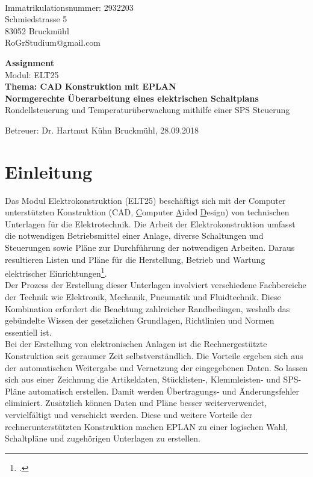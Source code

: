 \documentclass[12pt,a4paper]{scrartcl}	%
\begin{document}
\begin{titlepage}
	\\
	Immatrikulationsnummer:	2932203\\
	Schmiedstrasse 5\\
	83052 Bruckmühl\\
	RoGrStudium@gmail.com\\
	\vspace{5cm}
	
	\begin{center}
		{\Huge \textbf{Assignment} }\\ 
		Modul: ELT25\\
		\vspace{1cm}
		\textbf{Thema: CAD Konstruktion mit EPLAN}\\
				\textbf{ Normgerechte Überarbeitung eines elektrischen Schaltplans }\\
		Rondellsteuerung und Temperaturüberwachung mithilfe einer SPS Steuerung
	\end{center}
	
	\vspace{6cm}
	Betreuer: Dr. Hartmut Kühn
	\vfill Bruckmühl, 28.09.2018

\end{titlepage}
\newpage
\tableofcontents
\newpage
\clearpage
\thispagestyle{empty}
\listoffigures
\newpage

\clearpage
\thispagestyle{empty}
\newpage

\setcounter{page}{1}
\section{Einleitung}
Das Modul Elektrokonstruktion (ELT25) beschäftigt sich mit der Computer unterstützten Konstruktion (CAD, \underline{C}omputer \underline{A}ided \underline{D}esign) von technischen Unterlagen für die Elektrotechnik. Die Arbeit der Elektrokonstruktion umfasst die notwendigen Betriebsmittel einer Anlage, diverse Schaltungen und Steuerungen sowie Pläne zur Durchführung der notwendigen Arbeiten. Daraus resultieren Listen und Pläne für die Herstellung, Betrieb und Wartung elektrischer Einrichtungen\footcite[vgl.][S 3]{grund}.\\
Der Prozess der Erstellung dieser Unterlagen involviert verschiedene Fachbereiche der Technik wie Elektronik, Mechanik, Pneumatik und Fluidtechnik. Diese Kombination erfordert die Beachtung zahlreicher Randbedingen, weshalb das gebündelte Wissen der gesetzlichen Grundlagen, Richtlinien und Normen essentiell ist.\\
Bei der Erstellung von elektronischen Anlagen ist die Rechnergestützte Konstruktion seit geraumer Zeit selbstverständlich. Die Vorteile ergeben sich aus der automatischen Weitergabe und Vernetzung der eingegebenen Daten. So lassen sich aus einer Zeichnung die Artikeldaten\-, Stücklisten-, Klemmleisten- und SPS-Pläne automatisch erstellen. Damit werden Übertragungs- und Änderungsfehler eliminiert. Zusätzlich können Daten und Pläne besser weiterverwendet, vervielfältigt und verschickt werden.
Diese und weitere Vorteile der rechnerunterstützten Konstruktion machen EPLAN zu einer logischen Wahl, Schaltpläne und zugehörigen Unterlagen zu erstellen.
\end{document}
